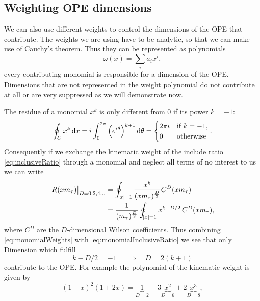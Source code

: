 \documentclass[../../index.tex]{subfiles}
\begin{document}
\subsection{Weighting OPE dimensions}
We can also use different weights to control the dimensions of the OPE that
contribute. The weights we are using have to be analytic, so that we can make
use of Cauchy's theorem. Thus they can be represented as polynomials
\begin{equation}
  \omega(x) = \sum_i a_i x^i,
\end{equation}
every contributing monomial is responsible for a dimension of the OPE.
Dimensions that are not represented in the weight polynomial do not contribute
at all or are very suppressed as we will demonstrate now.

The residue of a monomial $x^k$ is only different from 0 if its power $k=-1$:
\begin{equation}
  \label{eq:monomialWeights}
  \oint_{C} x^k \dif x = i \int_0^{2\pi}\left(e^{i \theta}\right)^{k+1} \dif \theta
  = \begin{cases} \mbox{$2 \pi i$} & \mbox{if } k=-1, \\ \mbox{0} & \mbox{otherwise} \end{cases}.
\end{equation}
Consequently if we exchange the kinematic weight of the include ratio
\cref{eq:inclusiveRatio} through a monomial and neglect all terms of no interest
to us we can write
\begin{equation}
  \label{eq:monomialInclusiveRatio}
  \begin{split}
    \left. R(x m_\tau) \right\rvert_{D=0,2,4\dots} &= \oint_{\abs{x}=1} \frac{x^k}{(x m_\tau)^{\frac{D}{2}}}C^{D}(x m_\tau) \\
    &= \frac{1}{(m_\tau)^{\frac{D}{2}}} \oint_{\abs{x}=1} x^{k-D/2} \,C^{D}(x
    m_\tau),
  \end{split}
\end{equation}
where $C^{D}$ are the $D$-dimensional Wilson coefficients. Thus combining
\cref{eq:monomialWeights} with \cref{eq:monomialInclusiveRatio} we see that only
Dimension which fulfill
\begin{equation}
  k - D/2 = -1 \quad \implies \quad  D = 2(k+1)
\end{equation}
contribute to the OPE. For example the polynomial of the kinematic weight is
given by
\begin{equation}
  (1 - x)^2 (1 + 2x) = \underbrace{1}_{D=2} - 3\underbrace{x^2}_{D=6} + 2\underbrace{x^3}_{D=8},
\end{equation}
\end{document}

